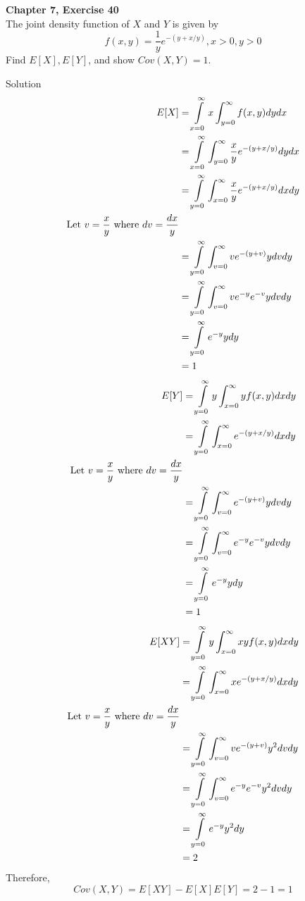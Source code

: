\documentclass{article}
\begin{document}
\begin{spacing}{1.1}
\newpage
\begin{homeworkProblem}
  {\bf Chapter 7, Exercise 40}\\
  The joint density function of $X$ and $Y$ is given by
    \[f( x, y) = \frac{ 1}{ y} e^{-(y + x / y)}, x > 0, y > 0\]
  Find $E[ X], E[ Y]$, and show $Cov( X, Y) = 1$.
  \begin{homeworkSection}{Solution}
    \begin{align*}
      E[ X] &= \int\limits_{x = 0}^\infty x \int_{y = 0}^\infty f( x, y) dy dx\\
      &= \int\limits_{x = 0}^\infty \int_{y = 0}^\infty \frac{ x}{ y} e^{-(y + x / y)} dy dx\\
      &= \int\limits_{y = 0}^\infty \int_{x = 0}^\infty \frac{ x}{ y} e^{-(y + x / y)} dx dy\\
      \text{Let $ v = \frac{ x}{ y}$ where $dv = \frac{ dx}{ y}$}\\
      &= \int\limits_{y = 0}^\infty \int_{v = 0}^\infty v e^{-(y + v)} y dv dy\\
      &= \int\limits_{y = 0}^\infty \int_{v = 0}^\infty v e^{-y} e^{-v} y dv dy\\
      &= \int\limits_{y = 0}^\infty e^{-y} y dy\\
      &= 1
    \end{align*}
    \begin{align*}
      E[ Y] &= \int\limits_{y = 0}^\infty y \int_{x = 0}^\infty y f( x, y) dx dy\\
      &= \int\limits_{y = 0}^\infty \int_{x = 0}^\infty e^{-(y + x / y)} dx dy\\
      \text{Let $ v = \frac{ x}{ y}$ where $dv = \frac{ dx}{ y}$}\\
      &= \int\limits_{y = 0}^\infty \int_{v = 0}^\infty e^{-(y + v)} y dv dy\\
      &= \int\limits_{y = 0}^\infty \int_{v = 0}^\infty e^{-y} e^{-v} y dv dy\\
      &= \int\limits_{y = 0}^\infty  e^{-y} y dy\\
      &= 1
    \end{align*}
    \begin{align*}
      E[ XY] &= \int\limits_{y = 0}^\infty y \int_{x = 0}^\infty xy f( x, y) dx dy\\
      &= \int\limits_{y = 0}^\infty \int_{x = 0}^\infty xe^{-(y + x / y)} dx dy\\
      \text{Let $ v = \frac{ x}{ y}$ where $dv = \frac{ dx}{ y}$}\\
      &= \int\limits_{y = 0}^\infty \int_{v = 0}^\infty v e^{-(y + v)} y^2 dv dy\\
      &= \int\limits_{y = 0}^\infty \int_{v = 0}^\infty e^{-y} e^{-v} y^2 dv dy\\
      &= \int\limits_{y = 0}^\infty  e^{-y} y^2 dy\\
      &= 2
    \end{align*}
    Therefore, \[Cov(X, Y) = E[XY] - E[X]E[Y] = 2 - 1 = 1\]
  \end{homeworkSection}
\end{homeworkProblem}


\end{spacing}
\end{document}

